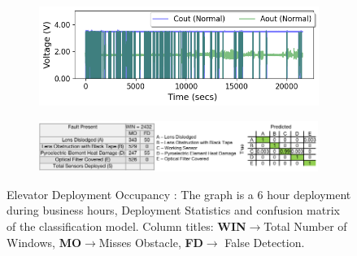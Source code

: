\begin{figure}
    \begin{subfigure}[t]{0.4\textwidth}
        \includegraphics[width=\textwidth]{figures/deployment/elevator/afternoon-6hr.png}
    	\caption{}
    	\label{fig:deployment_csl_elevator}%
	\end{subfigure}\hfill%
	\begin{subfigure}[b]{0.59\textwidth}
	    \includegraphics[width=\textwidth, height=0.65in]{figures/deployment/elevator/confusion-matrix-elevator-camera-ready.png}
		\caption{}
		\label{fig:elevator_classification_results}
	\end{subfigure}%
\caption{\footnotesize Elevator Deployment \ca Occupancy : The graph is a 6 hour deployment during business hours, \cb Deployment Statistics and confusion matrix of the classification model. Column titles: \textbf{WIN}$\rightarrow$Total Number of Windows, \textbf{MO}$\rightarrow$Misses Obstacle, \textbf{FD}$\rightarrow$ False Detection.}
\end{figure}
